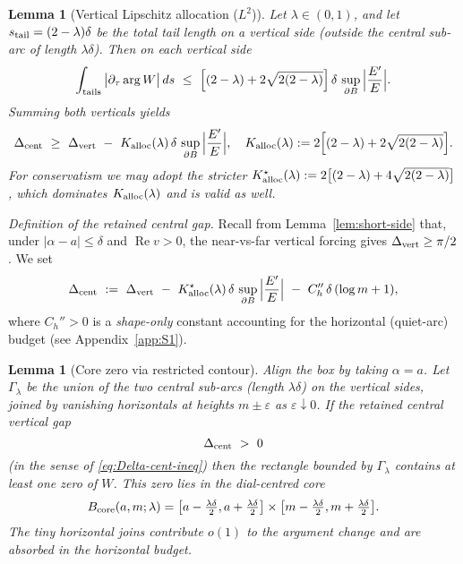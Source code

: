 \documentclass[11pt]{article}
\numberwithin{equation}{section}
\newtheorem{lemma}[theorem]{Lemma}
\theoremstyle{remark}
\DeclareMathOperator{\Real}{Re}
\begin{document}
\begin{lemma}[Vertical Lipschitz allocation ($L^2$)]\label{lem:allocL2}
Let $\lambda\in(0,1)$, and let $s_{\rm tail}=(2-\lambda)\delta$ be the total tail length on a vertical side (outside the central sub-arc of length $\lambda\delta$). %
Then on each vertical side
\begin{equation}\label{eq:alloc-one} %
\int_{\textup{tails}} \big|\partial_\tau \arg W\big|\,ds
\ \le\ \Big[(2-\lambda)+2\sqrt{2(2-\lambda)}\Big]\,\delta\,\sup_{\partial B}\Big|\frac{E'}{E}\Big|.
\end{equation}
Summing both verticals yields
\begin{equation}\label{eq:alloc-two} %
\Delta_{\rm cent}\ \ge\ \Delta_{\rm vert}\ -\ K_{\rm alloc}(\lambda)\,\delta\,\sup_{\partial B}\Big|\frac{E'}{E}\Big|,
\quad
K_{\rm alloc}(\lambda):=2\Big[(2-\lambda)+2\sqrt{2(2-\lambda)}\Big].
\end{equation}
For conservatism we may adopt the stricter $K_{\rm alloc}^{\star}(\lambda):=2\big[(2-\lambda)+4\sqrt{2(2-\lambda)}\big]$, which dominates $K_{\rm alloc}(\lambda)$ and is valid as well. %
\end{lemma}

\noindent\textit{Definition of the retained central gap.} Recall from Lemma~\ref{lem:short-side} that, under $|\alpha-a|\le\delta$ and $\Real v>0$, the near-vs-far vertical forcing gives $\Delta_{\rm vert}\ge \pi/2$. We set
\begin{equation}\label{eq:Delta-cent-ineq}
\Delta_{\rm cent}\ :=\ \Delta_{\rm vert}\ -\ K_{\rm alloc}^{\star}(\lambda)\,\delta\,\sup_{\partial B}\Big|\frac{E'}{E}\Big| \ -\ C_h''\,\delta\,(\log m+1),
\end{equation}
where $C_h''>0$ is a \emph{shape-only} constant accounting for the horizontal (quiet-arc) budget (see Appendix~\ref{app:S1}). %

\begin{lemma}[Core zero via restricted contour]\label{lem:corezero}
Align the box by taking $\alpha=a$. Let $\Gamma_\lambda$ be the union of the two central sub-arcs (length $\lambda\delta$) on the vertical sides, joined by vanishing horizontals at heights $m\pm\varepsilon$ as $\varepsilon\downarrow 0$. If the retained central vertical gap
\[
\Delta_{\rm cent}\ >\ 0
\]
(in the sense of \eqref{eq:Delta-cent-ineq}) then the rectangle bounded by $\Gamma_\lambda$ contains at least one zero of $W$. This zero lies in the dial-centred core
\[
B_{\rm core}(a,m;\lambda)=\big[a-\tfrac{\lambda\delta}{2},a+\tfrac{\lambda\delta}{2}\big]\times \big[m-\tfrac{\lambda\delta}{2},m+\tfrac{\lambda\delta}{2}\big].
\]
The tiny horizontal joins contribute $o(1)$ to the argument change and are absorbed in the horizontal budget. %
\end{lemma}
\end{document}
